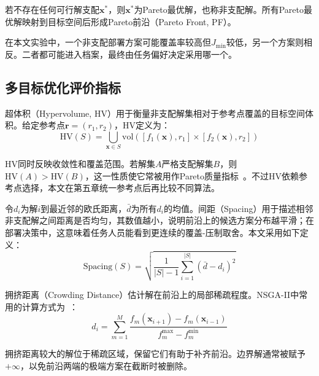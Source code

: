 \begin{definition}[Pareto最优解]
若不存在任何可行解支配$\mathbf{x}^*$，则$\mathbf{x}^*$为Pareto最优解，也称非支配解。所有Pareto最优解映射到目标空间后形成Pareto前沿（Pareto Front, PF）。
\end{definition}

在本文实验中，一个非支配部署方案可能覆盖率较高但$J_{\min}$较低，另一个方案则相反。二者都可能进入档案，最终由任务偏好决定采用哪一个。

\subsection{多目标优化评价指标}

超体积（Hypervolume, HV）用于衡量非支配解集相对于参考点覆盖的目标空间体积。给定参考点$\mathbf{r} = (r_1, r_2)$，HV定义为：
\vspace{-0.5\baselineskip}
\begin{equation}
\text{HV}(S) = \bigcup_{\mathbf{x} \in S} \text{vol}\left([f_1(\mathbf{x}), r_1] \times [f_2(\mathbf{x}), r_2]\right)
\label{eq:hv}
\end{equation}
\vspace{-1.5\baselineskip}

HV同时反映收敛性和覆盖范围。若解集$A$严格支配解集$B$，则$\text{HV}(A) > \text{HV}(B)$，这一性质使它常被用作Pareto质量指标~\cite{Zitzler2001}。不过HV依赖参考点选择，本文在第五章统一参考点后再比较不同算法。

令$d_i$为解$i$到最近邻的欧氏距离，$\bar{d}$为所有$d_i$的均值。间距（Spacing）用于描述相邻非支配解之间距离是否均匀，其数值越小，说明前沿上的候选方案分布越平滑；在部署决策中，这意味着任务人员能看到更连续的覆盖-压制取舍。本文采用如下定义：
\begin{equation}
\text{Spacing}(S) = \sqrt{\frac{1}{|S|-1} \sum_{i=1}^{|S|} (\bar{d} - d_i)^2}
\label{eq:spacing}
\end{equation}

拥挤距离（Crowding Distance）估计解在前沿上的局部稀疏程度。NSGA-II中常用的计算方式为~\cite{Deb2002}：
\vspace{0pt}
\begin{equation}
d_i = \sum_{m=1}^{M} \frac{f_m(\mathbf{x}_{i+1}) - f_m(\mathbf{x}_{i-1})}{f_m^{\max} - f_m^{\min}}
\label{eq:crowding}
\end{equation}
\vspace{-1.0\baselineskip}

拥挤距离较大的解位于稀疏区域，保留它们有助于补齐前沿。边界解通常被赋予$+\infty$，以免前沿两端的极端方案在截断时被删除。

